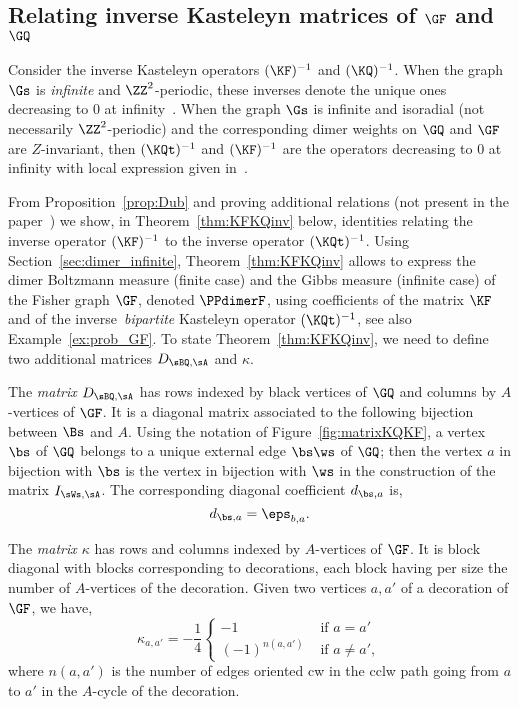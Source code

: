 \documentclass[a4paper,twoside,11pt]{article}
\begin{document}
\subsection{Relating inverse Kasteleyn matrices of $\GF$ and $\GQ$}\label{sec:relation_KF_KQ_inv}

Consider the inverse Kasteleyn operators $(\KF)^{-1}$ and $(\KQ)^{-1}$.
When the graph $\Gs$ is \emph{infinite} and $\ZZ^2$-periodic, these inverses denote the unique ones decreasing to 0 at infinity~\cite{KOS,BoutillierdeTiliere:iso_perio}. 
When the graph $\Gs$ is infinite and isoradial (not necessarily $\ZZ^2$-periodic) and the corresponding dimer weights on $\GQ$ and $\GF$ are $Z$-invariant, 
then $(\KQt)^{-1}$ and $(\KF)^{-1}$ are the operators decreasing to 0 at infinity with local expression given 
in~\cite{Kenyon3,BoutillierdeTiliere:iso_gen,BdtR2}.



From Proposition~\ref{prop:Dub} and proving additional relations (not present in the paper~\cite{Dubedat}) we show, in 
Theorem~\ref{thm:KFKQinv} below, identities relating the inverse operator $(\KF)^{-1}$ to the inverse operator $(\KQt)^{-1}$. 
Using Section~\ref{sec:dimer_infinite}, Theorem~\ref{thm:KFKQinv} allows to express the dimer Boltzmann measure (finite case)
and the Gibbs measure (infinite case) of the Fisher graph $\GF$, denoted $\PPdimerF$, using coefficients of the matrix 
$\KF$ and of the inverse~\emph{bipartite} Kasteleyn operator $(\KQt)^{-1}$, see also Example~\ref{ex:prob_GF}.
To state Theorem~\ref{thm:KFKQinv}, we need to define 
two additional matrices $D_{\sBQ,\sA}$ and $\kappa$. 

The \emph{matrix $D_{\sBQ,\sA}$} has rows indexed by 
black vertices of $\GQ$ and columns by $A$-vertices of $\GF$. It is a diagonal matrix associated to the following bijection
between $\Bs$ and $A$. Using the notation of Figure~\ref{fig:matrixKQKF}, a vertex $\bs$ of $\GQ$ belongs to a unique external
edge $\bs\ws$ of $\GQ$; then the vertex $a$ in bijection with $\bs$ is the vertex in bijection with $\ws$ in the construction of 
the matrix $I_{\sWs,\sA}$. The corresponding diagonal coefficient $d_{\bs,a}$ is,
\begin{equation*}
d_{\bs,a}=\eps_{b,a}.
\end{equation*}


The \emph{matrix $\kappa$} has rows and columns indexed by $A$-vertices of $\GF$. It is block diagonal with blocks corresponding
to decorations, each block having per size the number of $A$-vertices of the decoration.
Given two vertices $a,a'$ of a decoration of $\GF$, we have,
\begin{equation*}
\kappa_{a,a'}=-\frac{1}{4}
\begin{cases}
-1&\text{ if } a=a'\\
(-1)^{n(a,a')}&\text{ if }a\neq a',
\end{cases}
\end{equation*}
where $n(a,a')$ is the number of edges oriented cw in the cclw path going from $a$ to $a'$ in the $A$-cycle of the decoration. 
\end{document}
